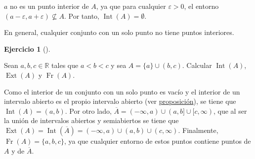 \documentclass[
  a4paper,
]{scrreport}
\theoremstyle{definition}
\newtheorem{exercise}{Ejercicio}[chapter]
\theoremstyle{remark}
\begin{document}
\begin{tcolorbox}[enhanced jigsaw, left=2mm, coltitle=black, colbacktitle=quarto-callout-tip-color!10!white, opacitybacktitle=0.6, colback=white, breakable, titlerule=0mm, toptitle=1mm, rightrule=.15mm, bottomtitle=1mm, bottomrule=.15mm, toprule=.15mm, leftrule=.75mm, arc=.35mm, opacityback=0, title=\textcolor{quarto-callout-tip-color}{\faLightbulb}\hspace{0.5em}{Solución}, colframe=quarto-callout-tip-color-frame]

\(a\) no es un punto interior de \(A\), ya que para cualquier
\(\varepsilon>0\), el entorno
\((a-\varepsilon, a+\varepsilon)\not\subseteq A\). Por tanto,
\(\operatorname{Int}(A)=\emptyset\).

En general, cualquier conjunto con un solo punto no tiene puntos
interiores.

\end{tcolorbox}

\begin{exercise}[]\protect\hypertarget{exr-interior-exterior-frontera}{}\label{exr-interior-exterior-frontera}

Sean \(a,b,c\in\mathbb{R}\) tales que \(a<b<c\) y sea
\(A=\{a\}\cup (b,c)\). Calcular \(\operatorname{Int}(A)\),
\(\operatorname{Ext}(A)\) y \(\operatorname{Fr}(A)\).

\end{exercise}

\begin{tcolorbox}[enhanced jigsaw, left=2mm, coltitle=black, colbacktitle=quarto-callout-tip-color!10!white, opacitybacktitle=0.6, colback=white, breakable, titlerule=0mm, toptitle=1mm, rightrule=.15mm, bottomtitle=1mm, bottomrule=.15mm, toprule=.15mm, leftrule=.75mm, arc=.35mm, opacityback=0, title=\textcolor{quarto-callout-tip-color}{\faLightbulb}\hspace{0.5em}{Solución}, colframe=quarto-callout-tip-color-frame]

Como el interior de un conjunto con un solo punto es vacío y el interior
de un intervalo abierto es el propio intervalo abierto (ver
\href{https://aprendeconalf.es/analisis-manual/topologia-reales.html\#prp-interior-intervalo-abierto}{proposición}),
se tiene que \(\operatorname{Int}(A)=(a,b)\). Por otro lado,
\(\overline{A}=(-\infty,a)\cup (a,b]\cup [c,\infty)\), que al ser la
unión de intervalos abiertos y semiabiertos se tiene que
\(\operatorname{Ext}(A)=\operatorname{Int}(\overline{A})=(-\infty,a)\cup (a,b)\cup (c,\infty)\).
Finalmente, \(\operatorname{Fr}(A)=\{a,b,c\}\), ya que cualquier entorno
de estos puntos contiene puntos de \(A\) y de \(\overline{A}\).

\end{tcolorbox}
\end{document}
